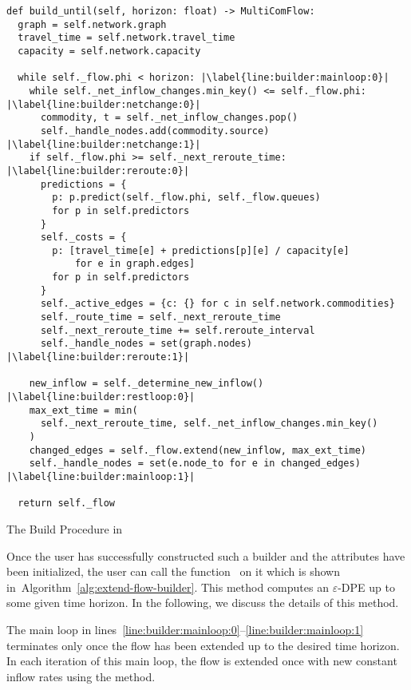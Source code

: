 \begin{algorithm}
  \begin{verbatim}
def build_until(self, horizon: float) -> MultiComFlow:
  graph = self.network.graph
  travel_time = self.network.travel_time
  capacity = self.network.capacity

  while self._flow.phi < horizon: |\label{line:builder:mainloop:0}|
    while self._net_inflow_changes.min_key() <= self._flow.phi: |\label{line:builder:netchange:0}|
      commodity, t = self._net_inflow_changes.pop()
      self._handle_nodes.add(commodity.source) |\label{line:builder:netchange:1}|
    if self._flow.phi >= self._next_reroute_time: |\label{line:builder:reroute:0}|
      predictions = {
        p: p.predict(self._flow.phi, self._flow.queues)
        for p in self.predictors
      }
      self._costs = {
        p: [travel_time[e] + predictions[p][e] / capacity[e]
            for e in graph.edges]
        for p in self.predictors
      }
      self._active_edges = {c: {} for c in self.network.commodities}
      self._route_time = self._next_reroute_time
      self._next_reroute_time += self.reroute_interval
      self._handle_nodes = set(graph.nodes) |\label{line:builder:reroute:1}|

    new_inflow = self._determine_new_inflow() |\label{line:builder:restloop:0}|
    max_ext_time = min(
      self._next_reroute_time, self._net_inflow_changes.min_key()
    )
    changed_edges = self._flow.extend(new_inflow, max_ext_time)
    self._handle_nodes = set(e.node_to for e in changed_edges) |\label{line:builder:mainloop:1}|

  return self._flow
\end{verbatim}
\caption{The Build Procedure in }
\label{alg:extend-flow-builder}
\end{algorithm}

Once the user has successfully constructed such a builder and the attributes have been initialized, the user can call the function~ on it which is shown in~Algorithm~\ref{alg:extend-flow-builder}.
This method computes an $\varepsilon$-DPE up to some given time horizon.
In the following, we discuss the details of this method.

The main loop in lines~\ref{line:builder:mainloop:0}--\ref{line:builder:mainloop:1} 
terminates only once the flow has been extended up to the desired time horizon.
In each iteration of this main loop, the flow is extended once with new constant inflow rates using the  method.

